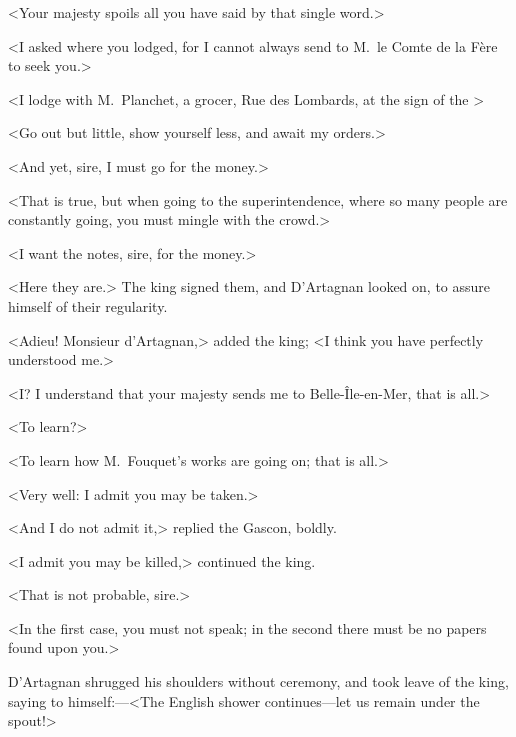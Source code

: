 <Your majesty spoils all you have said by that single word.>

<I asked where you lodged, for I cannot always send to M.~le Comte de la Fère to seek you.>

<I lodge with M.~Planchet, a grocer, Rue des Lombards, at the sign of the >

<Go out but little, show yourself less, and await my orders.>

<And yet, sire, I must go for the money.>

<That is true, but when going to the superintendence, where so many people are constantly going, you must mingle with the crowd.>

<I want the notes, sire, for the money.>

<Here they are.> The king signed them, and D'Artagnan looked on, to assure himself of their regularity.

<Adieu! Monsieur d'Artagnan,> added the king; <I think you have perfectly understood me.>

<I\@? I understand that your majesty sends me to Belle-Île-en-Mer, that is all.>

<To learn?>

<To learn how M.~Fouquet's works are going on; that is all.>

<Very well: I admit you may be taken.>

<And I do not admit it,> replied the Gascon, boldly.

<I admit you may be killed,> continued the king.

<That is not probable, sire.>

<In the first case, you must not speak; in the second there must be no papers found upon you.>

D'Artagnan shrugged his shoulders without ceremony, and took leave of the king, saying to himself:—<The English shower continues—let us remain under the spout!> 
